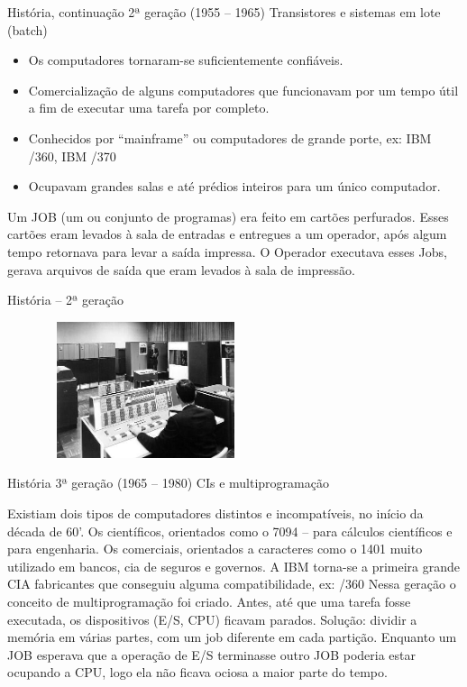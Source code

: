 \documentclass[11pt]{beamer}
\begin{document}
\begin{frame}{História, continuação}
	2ª geração (1955 -- 1965) Transistores e sistemas em lote (batch)
	\vspace{0.2in}
  \begin{itemize}
	    \item Os computadores tornaram-se suficientemente confiáveis.
	    \item Comercialização de alguns computadores que funcionavam por um tempo útil a fim de executar uma tarefa por completo.
	    \item Conhecidos por ``mainframe'' ou computadores de grande porte, ex: IBM /360, IBM /370
	    \item Ocupavam grandes salas e até prédios inteiros para um único computador.
  \end{itemize}	
Um JOB (um ou conjunto de programas) era feito em cartões perfurados. 
Esses cartões eram levados à sala de entradas e entregues a um operador, após algum tempo retornava para levar a saída impressa. 
O Operador executava esses Jobs, gerava arquivos de saída que eram levados à sala de impressão.
\end{frame}



\begin{frame}{História -- 2ª geração}
	\begin{figure}[h]
	\includegraphics[width=60mm, height=40mm]{Figuras/2-geracao.jpg}
	\end{figure}

\end{frame}

\begin{frame}{História}
  3ª geração (1965 -- 1980) CIs e multiprogramação
  \vspace{0.2in}
  
  Existiam dois tipos de computadores distintos e incompatíveis, no início da década de 60'.
  Os científicos, orientados como o 7094 -- para cálculos científicos e para engenharia.
  Os comerciais, orientados a caracteres como o 1401 muito utilizado em bancos, cia de seguros e governos.
  A IBM torna-se a primeira grande CIA fabricantes que conseguiu alguma compatibilidade, ex: /360
  Nessa geração o conceito de multiprogramação foi criado. Antes, até que uma tarefa fosse executada, os dispositivos (E/S, CPU) ficavam parados.
  Solução: dividir a memória em várias partes, com um job diferente em cada partição. Enquanto um JOB esperava que a operação de E/S terminasse
  outro JOB poderia estar ocupando a CPU, logo ela não ficava ociosa a maior parte do tempo.
\end{frame}
\end{document}
